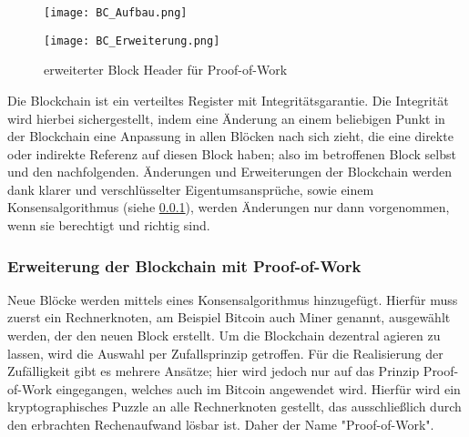 \begin{figure}[!h]
    \begin{minipage}{.66\textwidth}
        \texttt{[image: BC\_Aufbau.png]}
        \label{fig:BC_Aufbau}
    \end{minipage}
    \begin{minipage}{.33\textwidth}
        \texttt{[image: BC\_Erweiterung.png]}
        \caption{erweiterter Block Header für Proof-of-Work}
        \label{fig:BC_Erweiterung}
    \end{minipage}
\end{figure}


Die Blockchain ist  ein verteiltes Register mit Integritätsgarantie. Die Integrität 
wird hierbei sichergestellt, indem eine Änderung an einem beliebigen Punkt in der
Blockchain eine Anpassung in allen Blöcken nach sich zieht, die eine direkte oder
indirekte Referenz auf diesen Block haben; also im betroffenen Block selbst und den
nachfolgenden. Änderungen und Erweiterungen der Blockchain werden dank klarer 
und verschlüsselter Eigentumsansprüche, sowie einem Konsensalgorithmus (siehe \ref{sec:Erweiterung}), 
werden Änderungen nur dann vorgenommen, wenn sie berechtigt und richtig sind.
\cite[p.~22]{fill2020blockchain} 

\subsubsection{Erweiterung der Blockchain mit Proof-of-Work}
\label{sec:Erweiterung}
Neue Blöcke werden mittels eines Konsensalgorithmus hinzugefügt.
Hierfür muss zuerst ein Rechnerknoten, am Beispiel Bitcoin auch \glqq Miner\grqq{} genannt, ausgewählt werden, der den neuen Block erstellt. 
Um die Blockchain dezentral agieren zu lassen, wird die Auswahl per Zufallsprinzip getroffen.
Für die Realisierung der Zufälligkeit gibt es mehrere Ansätze; hier wird jedoch nur auf das
Prinzip \glqq Proof-of-Work\grqq{} eingegangen, welches auch im Bitcoin angewendet wird.
Hierfür wird ein kryptographisches Puzzle an alle Rechnerknoten gestellt, das ausschließlich
durch den erbrachten Rechenaufwand lösbar ist. Daher der Name "Proof-of-Work". 

